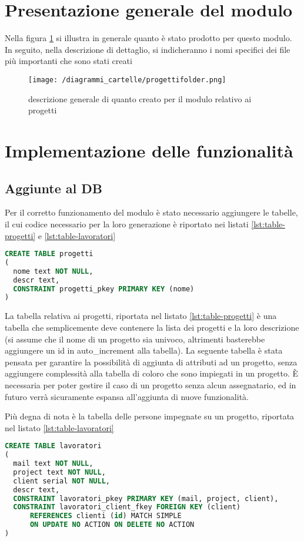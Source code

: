 \section{Presentazione generale del modulo}
Nella figura \ref{fig:cartelle-progetti} si illustra in generale quanto è stato prodotto per questo modulo. In seguito, nella descrizione di dettaglio, si indicheranno i nomi specifici dei file più importanti che sono stati creati
\begin{figure}[!ht]
\centering
\texttt{[image: /diagrammi\_cartelle/progettifolder.png]}
\caption{descrizione generale di quanto creato per il modulo relativo ai progetti\label{fig:cartelle-progetti}}
\end{figure}
\section{Implementazione delle funzionalità}
\subsection{Aggiunte al DB}
Per il corretto funzionamento del modulo è stato necessario aggiungere le tabelle, il cui codice necessario per la loro generazione è riportato nei listati \ref{lst:table-progetti} e \ref{lst:table-lavoratori}
\begin{lstlisting}[language=SQL,caption=codice per la tabella progetti, label=lst:table-progetti]
CREATE TABLE progetti
(
  nome text NOT NULL,
  descr text,
  CONSTRAINT progetti_pkey PRIMARY KEY (nome)
)
\end{lstlisting}
La tabella relativa ai progetti, riportata nel listato \ref{lst:table-progetti} è una tabella che semplicemente deve contenere la lista dei progetti e la loro descrizione (si assume  che il nome di un progetto sia univoco, altrimenti basterebbe aggiungere un id in auto\_increment alla tabella). La seguente tabella è stata pensata per garantire la possibilità di aggiunta di attributi ad un progetto,  senza aggiungere complessità alla tabella di coloro che sono impiegati in un progetto.
È necessaria per poter gestire il caso di un progetto senza alcun assegnatario, ed in futuro verrà sicuramente espansa all'aggiunta di nuove funzionalità.

Più degna di nota è la tabella delle persone impegnate su un progetto, riportata nel listato \ref{lst:table-lavoratori}

\begin{lstlisting}[language=SQL,caption=codice per la tabella lavoratori, label=lst:table-lavoratori]
CREATE TABLE lavoratori
(
  mail text NOT NULL,
  project text NOT NULL,
  client serial NOT NULL,
  descr text,
  CONSTRAINT lavoratori_pkey PRIMARY KEY (mail, project, client),
  CONSTRAINT lavoratori_client_fkey FOREIGN KEY (client)
      REFERENCES clienti (id) MATCH SIMPLE
      ON UPDATE NO ACTION ON DELETE NO ACTION
)
\end{lstlisting}

